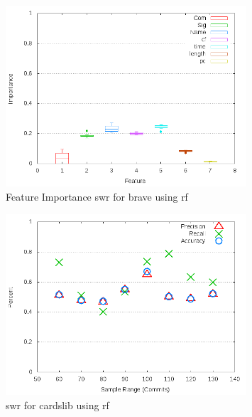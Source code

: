\begin{figure}[!t]
\centering
\includegraphics[width=0.8\textwidth]{images/rf/test_1/brave_importance.png}
\caption{Feature Importance \gls{swr} for brave using \gls{rf}}
\label{fig:test_1_brave_rf_importance}
\end{figure}

\begin{figure}[!t]
\centering
\includegraphics[width=0.8\textwidth]{images/rf/test_1/cardslib_sample_range.png}
\caption{\gls{swr} for cardslib using \gls{rf}}
\label{fig:test_1_cardslib_rf}
\end{figure}

